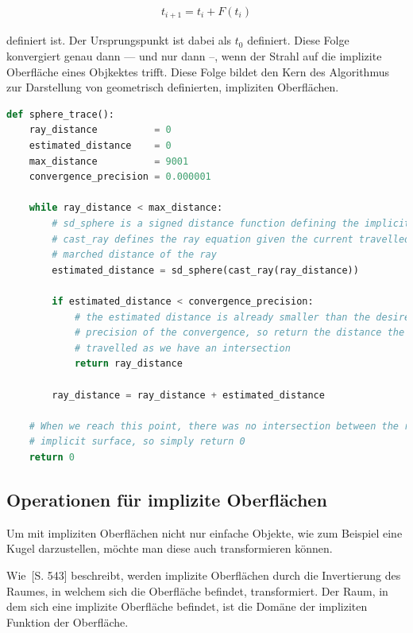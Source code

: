\begin{gather}
    t_{i+1} = t_{i} + F(t_{i})
\end{gather}

definiert ist. Der Ursprungspunkt ist dabei als $t_{0}$ definiert. Diese Folge
konvergiert genau dann --- und nur dann --, wenn der Strahl auf die implizite
Oberfläche eines Objkektes trifft. Diese Folge bildet den Kern des Algorithmus
zur Darstellung von geometrisch definierten, impliziten Oberflächen.

\begin{lstlisting}[language=Python,caption={Eine abstrakte Umsetzung des Sphere
        Tracings\protect\footnotemark.},label={alg:sphere_tracing},captionpos=b,emph={sphere_trace}]
def sphere_trace():
    ray_distance          = 0
    estimated_distance    = 0
    max_distance          = 9001
    convergence_precision = 0.000001

    while ray_distance < max_distance:
        # sd_sphere is a signed distance function defining the implicit surface
        # cast_ray defines the ray equation given the current travelled /
        # marched distance of the ray
        estimated_distance = sd_sphere(cast_ray(ray_distance))

        if estimated_distance < convergence_precision:
            # the estimated distance is already smaller than the desired
            # precision of the convergence, so return the distance the ray has
            # travelled as we have an intersection
            return ray_distance

        ray_distance = ray_distance + estimated_distance

    # When we reach this point, there was no intersection between the ray and a
    # implicit surface, so simply return 0
    return 0
\end{lstlisting}

\subsection{Operationen für implizite Oberflächen}
\label{subsec:implicit_surfaces_ops}

Um mit impliziten Oberflächen nicht nur einfache Objekte, wie zum Beispiel eine
Kugel darzustellen, möchte man diese auch transformieren können.

Wie~\cite{hart_sphere_1994}[S. 543] beschreibt, werden implizite Oberflächen
durch die Invertierung des Raumes, in welchem sich die Oberfläche befindet,
transformiert. Der Raum, in dem sich eine implizite Oberfläche befindet, ist
die Domäne der impliziten Funktion der Oberfläche.

